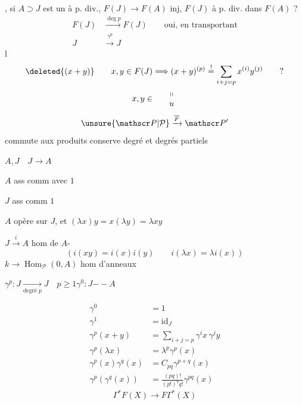 , si $A\supset J$ est un  à p. div.,  $F(J)\longrightarrow F(A)$ inj,  $F(J)$ à p. div. dans $F(A)$ ?
\[
\begin{aligned}
F(J)&\xrightarrow{\deg p}F(J)\qquad\text{oui, en transportant}\\
J&\xrightarrow{\gamma^p}J
\end{aligned}
\]
 l
\[
\begin{aligned}
\deleted{(x+y)}\qquad x,y\in F(J)&\Longrightarrow (x+y)^{(p)}\overset{!}{=}\sum_{i+j=p}x^{(i)}y^{(j)}\qquad ?\\
x,y\in&\qquad\begin{matrix}\shortparallel\\u\end{matrix}
\end{aligned}
\]
\[
\unsure{\mathscr P|\mathcal P}\xrightarrow{\overline F}\mathscr P'
\]
commute aux produits conserve degré et degrés partiels



$A,J\quad J\to A$

$A$  ass comm avec $1$

$J$  ass comm  $1$

$A$ opère sur $J$, et $(\lambda x)y=x(\lambda y)=\lambda xy$

$J\xrightarrow{i}A$ hom de $A$-
\[
(i(xy)=i(x)i(y)\qquad i(\lambda x)=\lambda i(x))
\]
$k\to\operatorname{Hom}_{\mathscr P}(0,A)$ hom d'anneaux

$\gamma^p:J\xrightarrow[\text{degré }p]{}J\quad p\geqslant1$\qquad $\gamma^0:J\mathrel{-\!\!-}A$

\[
\begin{aligned}
\gamma^0&=1\\
\gamma^1&=\mathrm{id}_J\\
\gamma^p(x+y)&=\sum_{i+j=p}\gamma^i x\,\gamma^j y\\
\gamma^p(\lambda x)&=\lambda^p\gamma^p(x)\\
\gamma^p(x)\gamma^q(x)&=C_{pq}\gamma^{p+q}(x)\\
\gamma^p(\gamma^q(x))&=\frac{(pq)!}{(p!)^q q!}\gamma^{pq}(x)
\end{aligned}
\]
\uline{}
\[
\Gamma^* F(X)\longrightarrow F\Gamma^*(X)
\]

